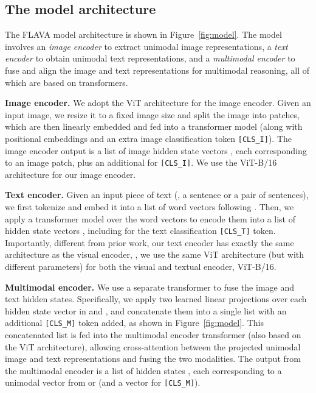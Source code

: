 \documentclass[10pt,twocolumn,letterpaper]{article}
\newcommand{\myparagraph}[1]{\vspace{0.25em}\noindent\textbf{#1}}
\begin{document}
\subsection{The model architecture}
\label{sec:architecture}

The FLAVA model architecture is shown in Figure~\ref{fig:model}. The model involves an \textit{image encoder} to extract unimodal image representations, a \textit{text encoder} to obtain unimodal text representations, and a \textit{multimodal encoder} to fuse and align the image and text representations for multimodal reasoning, all of which are based on transformers.

\myparagraph{Image encoder.} We adopt the ViT architecture \cite{dosovitskiy2020image} for the image encoder. Given an input image, we resize it to a fixed image size and split the image into patches, which are then linearly embedded and fed into a transformer model (along with positional embeddings and an extra image classification token \texttt{[CLS\_I]}). The image encoder output is a list of image hidden state vectors , each corresponding to an image patch, plus an additional  for \texttt{[CLS\_I]}. We use the ViT-B/16 architecture for our image encoder.

\myparagraph{Text encoder.} Given an input piece of text (\eg, a sentence or a pair of sentences), we first tokenize and embed it into a list of word vectors following \cite{devlin2018bert}. Then, we apply a transformer model over the word vectors to encode them into a list of hidden state vectors , including  for the text classification \texttt{[CLS\_T]} token. Importantly, different from prior work, our text encoder has exactly the same architecture as the visual encoder, \ie, we use the same ViT architecture (but with different parameters) for both the visual and textual encoder, \ie ViT-B/16.

\myparagraph{Multimodal encoder.} We use a separate transformer to fuse the image and text hidden states. Specifically, we apply two learned linear projections over each hidden state vector in  and , and concatenate them into a single list with an additional \texttt{[CLS\_M]} token added, as shown in Figure~\ref{fig:model}. This concatenated list is fed into the multimodal encoder transformer (also based on the ViT architecture), allowing cross-attention between the projected unimodal image and text representations and fusing the two modalities. The output from the multimodal encoder is a list of hidden states , each corresponding to a unimodal vector from  or  (and a vector  for \texttt{[CLS\_M]}).
\end{document}
